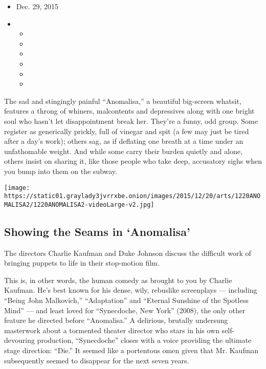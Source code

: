\begin{itemize}
\item
  Dec. 29, 2015
\item
  \begin{itemize}
  \item
  \item
  \item
  \item
  \item
  \item
  \end{itemize}
\end{itemize}

The sad and stingingly painful ``Anomalisa,'' a beautiful big-screen
whatsit, features a throng of whiners, malcontents and depressives along
with one bright soul who hasn't let disappointment break her. They're a
funny, odd group. Some register as generically prickly, full of vinegar
and spit (a few may just be tired after a day's work); others sag, as if
deflating one breath at a time under an unfathomable weight. And while
some carry their burden quietly and alone, others insist on sharing it,
like those people who take deep, accusatory sighs when you bump into
them on the subway.

\href{https://www.nytimes3xbfgragh.onion/interactive/2015/12/18/movies/anomalisa-behind-the-scenes.html}{}

\texttt{[image: https://static01.graylady3jvrrxbe.onion/images/2015/12/20/arts/1220ANOMALISA2/1220ANOMALISA2-videoLarge-v2.jpg]}

\hypertarget{showing-the-seams-in-anomalisa}{%
\subsection{Showing the Seams in
`Anomalisa'}\label{showing-the-seams-in-anomalisa}}

The directors Charlie Kaufman and Duke Johnson discuss the difficult
work of bringing puppets to life in their stop-motion film.

This is, in other words, the human comedy as brought to you by Charlie
Kaufman. He's best known for his dense, wily, rebuslike screenplays ---
including ``Being John Malkovich,'' ``Adaptation'' and ``Eternal
Sunshine of the Spotless Mind'' --- and least loved for ``Synecdoche,
New York'' (2008), the only other feature he directed before
``Anomalisa.'' A delirious, brutally undersung masterwork about a
tormented theater director who stars in his own self-devouring
production, ``Synecdoche'' closes with a voice providing the ultimate
stage direction: ``Die.'' It seemed like a portentous omen given that
Mr. Kaufman subsequently seemed to disappear for the next seven years.


